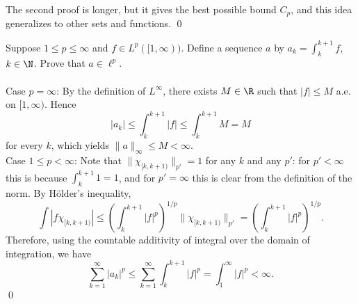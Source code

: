\begin{hwsol}
The second proof is longer, but it gives the best possible bound $C_p$, and this idea generalizes to other sets and functions. \qed \\
\end{hwsol}


\begin{hwsol}
Suppose $1 \leq p \leq \infty $ and $f \in L^p([1,\infty))$. Define a sequence $a$ by $a_k= \int_k^{k+1} f$, $k \in \N$. Prove that $a \in \ell^p$. \\

\pf \hfill \\
\noindent Case $p=\infty$: By the definition of $L^\infty$, there exists $M \in \R$ such that $|f| \leq M$ a.e. on $[1, \infty)$. Hence 
        \[
        |a_k| \leq \int_k^{k+1} |f| \leq \int_k^{k+1} M= M
        \]
for every $k$, which yields $\|a\|_\infty \leq M < \infty$. \\

\noindent Case $1\leq p<\infty$: Note that $\|\chi_{[k, k+1)}\|_{p'}= 1$ for any $k$ and any $p'$: for $p'<\infty$ this is because $\int_{k}^{k+1} 1= 1$, and for $p'= \infty$ this is clear from the definition of the norm. By H\"older's inequality,  
        \[
        \int |f\chi_{[k, k+1)}| \leq \left( \int_k^{k+1} |f|^p \right)^{1/p} \|\chi_{[k, k+1)} \|_{p'}= \left(\int_k^{k+1} |f|^p\right)^{1/p}.
        \]
Therefore, using the countable additivity of integral over the domain of integration, we have
        \[
        \sum_{k=1}^\infty |a_k|^p \leq \sum_{k=1}^\infty  \int_k^{k+1} |f|^p= \int_1^\infty |f|^p  < \infty.
        \] \qed \\
\end{hwsol}


